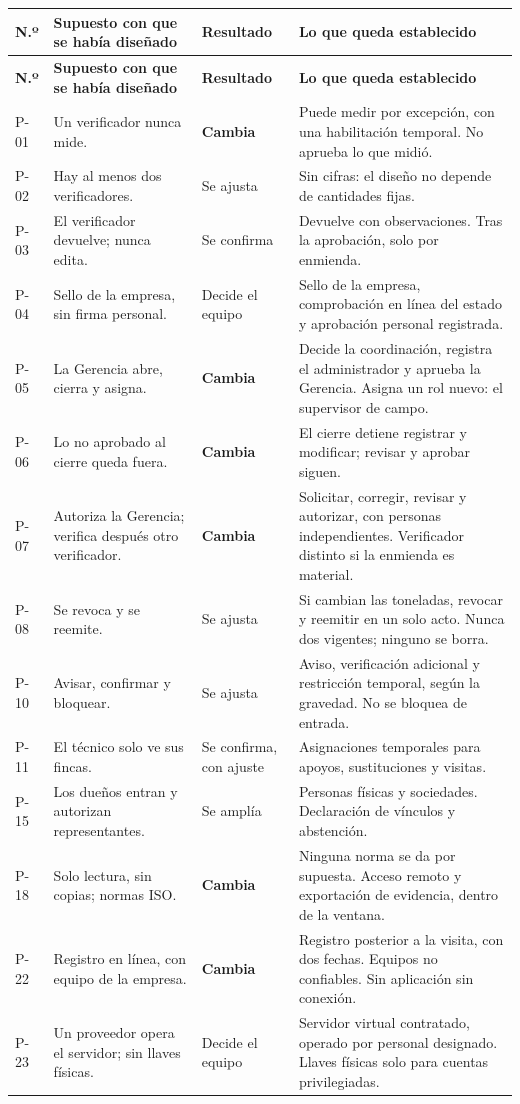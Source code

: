 \documentclass[11pt,letterpaper]{article}
\newcommand{\cab}[1]{\textbf{\rmfamily #1}}
\begin{document}
{\small
\renewcommand{\arraystretch}{1.22}
\begin{longtable}{@{}L{1.1cm} L{5.0cm} L{2.6cm} L{6.8cm}@{}}
\toprule
\cab{N.º} & \cab{Supuesto con que se había diseñado} & \cab{Resultado} & \cab{Lo que queda establecido} \\
\midrule
\endfirsthead
\toprule
\cab{N.º} & \cab{Supuesto con que se había diseñado} & \cab{Resultado} & \cab{Lo que queda establecido} \\
\midrule
\endhead
\bottomrule
\endfoot
P-01 & Un verificador nunca mide. & \textbf{Cambia} & Puede medir por excepción, con una habilitación temporal. No aprueba lo que midió. \\
P-02 & Hay al menos dos verificadores. & Se ajusta & Sin cifras: el diseño no depende de cantidades fijas. \\
P-03 & El verificador devuelve; nunca edita. & Se confirma & Devuelve con observaciones. Tras la aprobación, solo por enmienda. \\
P-04 & Sello de la empresa, sin firma personal. & Decide el equipo & Sello de la empresa, comprobación en línea del estado y aprobación personal registrada. \\
P-05 & La Gerencia abre, cierra y asigna. & \textbf{Cambia} & Decide la coordinación, registra el administrador y aprueba la Gerencia. Asigna un rol nuevo: el supervisor de campo. \\
P-06 & Lo no aprobado al cierre queda fuera. & \textbf{Cambia} & El cierre detiene registrar y modificar; revisar y aprobar siguen. \\
P-07 & Autoriza la Gerencia; verifica después otro verificador. & \textbf{Cambia} & Solicitar, corregir, revisar y autorizar, con personas independientes. Verificador distinto si la enmienda es material. \\
P-08 & Se revoca y se reemite. & Se ajusta & Si cambian las toneladas, revocar y reemitir en un solo acto. Nunca dos vigentes; ninguno se borra. \\
P-10 & Avisar, confirmar y bloquear. & Se ajusta & Aviso, verificación adicional y restricción temporal, según la gravedad. No se bloquea de entrada. \\
P-11 & El técnico solo ve sus fincas. & Se confirma, con ajuste & Asignaciones temporales para apoyos, sustituciones y visitas. \\
P-15 & Los dueños entran y autorizan representantes. & Se amplía & Personas físicas y sociedades. Declaración de vínculos y abstención. \\
P-18 & Solo lectura, sin copias; normas ISO. & \textbf{Cambia} & Ninguna norma se da por supuesta. Acceso remoto y exportación de evidencia, dentro de la ventana. \\
P-22 & Registro en línea, con equipo de la empresa. & \textbf{Cambia} & Registro posterior a la visita, con dos fechas. Equipos no confiables. Sin aplicación sin conexión. \\
P-23 & Un proveedor opera el servidor; sin llaves físicas. & Decide el equipo & Servidor virtual contratado, operado por personal designado. Llaves físicas solo para cuentas privilegiadas. \\
\end{longtable}
}
\end{document}
